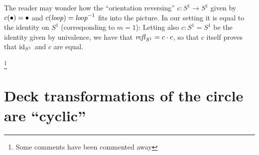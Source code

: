 

\begin{remark}
  \label{rem:flipthecircle}
  The reader may wonder how the ``orientation reversing'' $c:S^1\to S^1$ given by $c(\bullet)=\bullet$ and $c(\mathit{loop})=\mathit{loop}^{-1}$ fits into the picture.  In our setting it is equal to the identity on $S^1$ (corresponding to $m=1$): Letting also $c:S^1=S^1$ be the identity given by univalence, we have that $\mathop{{\it refl}_{S^1}}=c\cdot c$, so that $c$ itself proves that $\mathord{\mathrm{id}}_{S^1}$ and $c$ are equal.
\end{remark}





\footnote{Some comments have been commented away}

\section{Deck transformations of the circle are ``cyclic'' }
\label{sec:deckS1}

